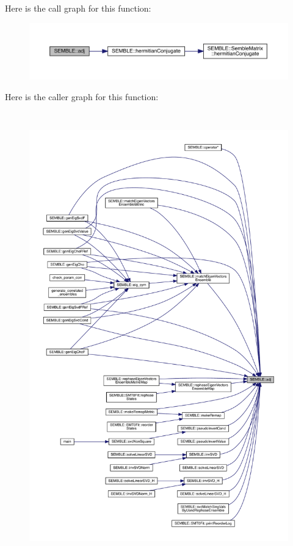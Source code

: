 Here is the call graph for this function\+:
\nopagebreak
\begin{figure}[H]
\begin{center}
\leavevmode
\includegraphics[width=350pt]{d7/dfd/namespaceSEMBLE_a2130d074e5c638bf8a6c280b531dd021_cgraph}
\end{center}
\end{figure}
Here is the caller graph for this function\+:
\nopagebreak
\begin{figure}[H]
\begin{center}
\leavevmode
\includegraphics[height=550pt]{d7/dfd/namespaceSEMBLE_a2130d074e5c638bf8a6c280b531dd021_icgraph}
\end{center}
\end{figure}
\mbox{\label{namespaceSEMBLE_a0a1c6eb7fdedb22ed457c065bc2a73f1}} 
